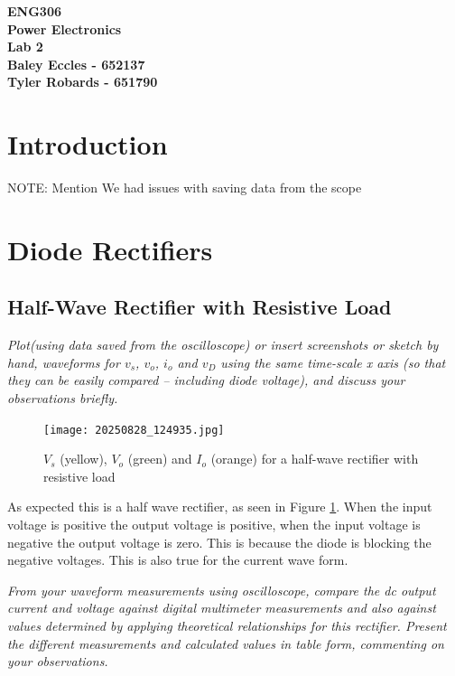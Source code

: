 \documentclass[12pt,a4paper]{article}
\begin{document}
\begin{center}
\textbf{\LARGE ENG306\\[6pt]
Power Electronics}\\[10pt]
\textbf{\large Lab 2\\[4pt]
Baley Eccles - 652137\\
Tyler Robards - 651790}\\
\end{center}

\tableofcontents
\newpage
\section{Introduction}
NOTE: Mention We had issues with saving data from the scope
\section{Diode Rectifiers}
\subsection{Half-Wave Rectifier with Resistive Load}
\textit{Plot(using data saved from the oscilloscope) or insert screenshots or sketch by hand, 
waveforms for $v_s$, $v_o$, $i_o$ and $v_D$ using the same time-scale x axis (so that they can be
easily compared – including diode voltage), and discuss your observations briefly.}\\

\begin{figure}[H]
\centering
\texttt{[image: 20250828\_124935.jpg]}
\caption{\(V_s\) (yellow), \(V_o\) (green) and \(I_o\) (orange) for a half-wave rectifier with resistive load \label{fig:figure1}}
\end{figure}

As expected this is a half wave rectifier, as seen in Figure \ref{fig:figure1}. When the input voltage is positive the output voltage is positive, when the input voltage is negative the output voltage is zero. This is because the diode is blocking the negative voltages. This is also true for the current wave form.

\textit{From your waveform measurements using oscilloscope, compare the dc output current 
and voltage against digital multimeter measurements and also against values determined by applying 
theoretical relationships for this rectifier. Present the different measurements and calculated 
values in table form, commenting on your observations.}\\
\end{document}
